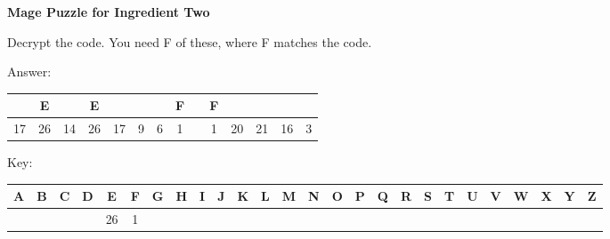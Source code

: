 \documentclass[white]{guildcamp3}
\begin{document}
\name{\wMagePuzzleTwo{}} %

\large\textbf{Mage Puzzle for Ingredient Two}  

Decrypt the code. You need F of these, where F matches the code. 

Answer:

\begin{tabular}{|c|c|c|c|c|c|c|c|c|c|c|c|c|c|}
	\hline \rule[-2ex]{0pt}{5.5ex}  & E &  & E &  &  &  & F &  & F &  &  &  &  \\ 
	\hline \rule[-2ex]{0pt}{5.5ex} 17 & 26 & 14 & 26 & 17 & 9 & 6 & 1 &  & 1 & 20 & 21 & 16 & 3 \\ 
	\hline 
\end{tabular} 

Key:

\small
\begin{tabular}{|c|c|c|c|c|c|c|c|c|c|c|c|c|c|c|c|c|c|c|c|c|c|c|c|c|c|}
	\hline \rule[-2ex]{0pt}{5.5ex} A & B & C & D & E & F & G & H & I & J & K & L & M & N & O & P & Q & R & S & T & U & V & W & X & Y & Z \\ 
	\hline \rule[-2ex]{0pt}{5.5ex}  &  &  &  & 26 & 1 &  &  &  &  &  &  &  &  &  &  &  &  &  &  &  &  &  &  &  &  \\ 
	\hline 
\end{tabular} 

\end{document}
